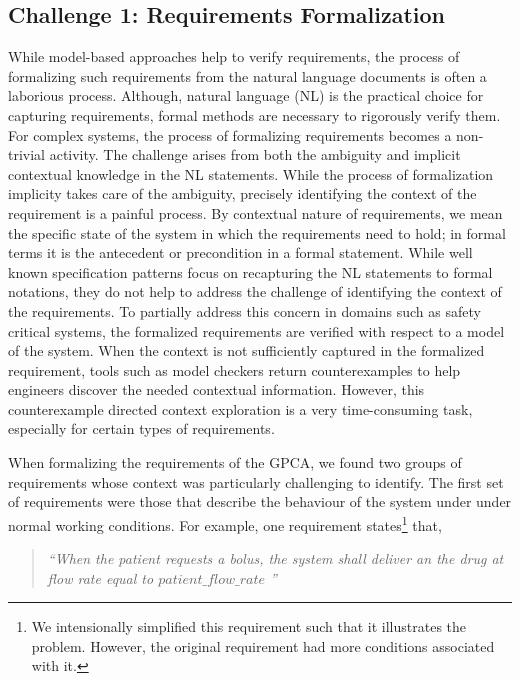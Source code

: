 \subsection{Challenge 1: Requirements Formalization}

While model-based approaches help to verify requirements, the process of formalizing such requirements from the natural language documents is often a laborious process. Although, natural language (NL) is the practical choice for capturing requirements, formal methods are necessary to rigorously verify them. For complex systems, the process of formalizing requirements becomes a non-trivial activity. The challenge arises from both the ambiguity and implicit contextual knowledge in the NL statements. While the process of formalization implicity takes care of the ambiguity, precisely identifying the context of the requirement is a painful process. By contextual nature of requirements, we mean the specific state of the system in which the requirements need to hold; in formal terms it is the antecedent or precondition in a formal statement. While well known specification patterns focus on recapturing the NL statements to formal notations, they do not help to address the challenge of identifying the context of the requirements. To partially address this concern in domains such as safety critical systems, the formalized requirements are verified with respect to a model of the system. When the context is not sufficiently captured in the formalized requirement, tools such as model checkers return counterexamples to help engineers discover the needed contextual information. However, this counterexample directed context exploration is a very time-consuming task, especially for certain types of requirements.

When formalizing the requirements of the GPCA, we found two groups of requirements whose context was particularly challenging to identify. The first set of requirements were those that describe the behaviour of the system under under normal working conditions. For example, one requirement states\footnote{\scriptsize{We intensionally simplified this requirement such that it illustrates the problem. However, the original requirement had more conditions associated with it.}} that,

\begin{quotation}
\emph{``When the patient requests a bolus, the system shall deliver an the drug at flow rate equal to $patient\_flow\_rate$ ''}
\end{quotation}

